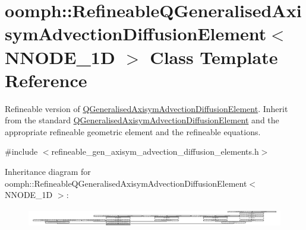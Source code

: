 \hypertarget{classoomph_1_1RefineableQGeneralisedAxisymAdvectionDiffusionElement}{}\section{oomph\+:\+:Refineable\+Q\+Generalised\+Axisym\+Advection\+Diffusion\+Element$<$ N\+N\+O\+D\+E\+\_\+1D $>$ Class Template Reference}
\label{classoomph_1_1RefineableQGeneralisedAxisymAdvectionDiffusionElement}


Refineable version of \hyperlink{classQGeneralisedAxisymAdvectionDiffusionElement}{Q\+Generalised\+Axisym\+Advection\+Diffusion\+Element}. Inherit from the standard \hyperlink{classQGeneralisedAxisymAdvectionDiffusionElement}{Q\+Generalised\+Axisym\+Advection\+Diffusion\+Element} and the appropriate refineable geometric element and the refineable equations.  




{\ttfamily \#include $<$refineable\+\_\+gen\+\_\+axisym\+\_\+advection\+\_\+diffusion\+\_\+elements.\+h$>$}

Inheritance diagram for oomph\+:\+:Refineable\+Q\+Generalised\+Axisym\+Advection\+Diffusion\+Element$<$ N\+N\+O\+D\+E\+\_\+1D $>$\+:\begin{figure}[H]
\begin{center}
\leavevmode
\includegraphics[height=0.809917cm]{classoomph_1_1RefineableQGeneralisedAxisymAdvectionDiffusionElement}
\end{center}
\end{figure}
